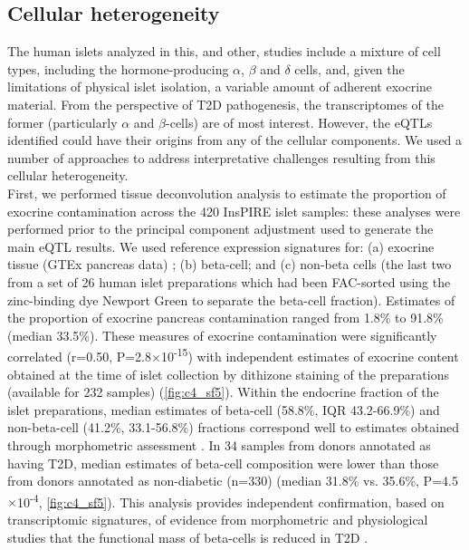 \subsection{Cellular heterogeneity}	 	 	 	
The human islets analyzed in this, and other, studies include a mixture of cell types, including the hormone-producing $\alpha$, $\beta$ and $\delta$ cells, and, given the limitations of physical islet isolation, a variable amount of adherent exocrine material. From the perspective of T2D pathogenesis, the transcriptomes of the former (particularly $\alpha$ and $\beta$-cells) are of most interest. However, the eQTLs identified could have their origins from any of the cellular components. We used a number of approaches to address interpretative challenges resulting from this cellular heterogeneity. \\
    
First, we performed tissue deconvolution analysis to estimate the proportion of exocrine contamination across the 420 InsPIRE islet samples: these analyses were performed prior to the principal component adjustment used to generate the main eQTL results. We used reference expression signatures for: (a) exocrine tissue (GTEx pancreas data) \cite{gtexconsortiumGeneticEffectsGene2017}; (b) beta-cell; and (c) non-beta cells (the last two from a set of 26 human islet preparations which had been FAC-sorted using the zinc-binding dye Newport Green to separate the beta-cell fraction). Estimates of the proportion of exocrine pancreas contamination ranged from 1.8\% to 91.8\% (median 33.5\%). These measures of exocrine contamination were significantly correlated (r=0.50, P=2.8$\times$10\textsuperscript{-15}) with independent estimates of exocrine content obtained at the time of islet collection by dithizone staining of the preparations (available for 232 samples) (\ref{fig:c4_sf5}). Within the endocrine fraction of the islet preparations, median estimates of beta-cell (58.8\%, IQR 43.2-66.9\%) and non-beta-cell (41.2\%, 33.1-56.8\%) fractions correspond well to estimates obtained through morphometric assessment \cite{kimIsletArchitectureComparative2009}. In 34 samples from donors annotated as having T2D, median estimates of beta-cell composition were lower than those from donors annotated as non-diabetic (n=330) (median 31.8\% vs. 35.6\%, P=4.5$\times$10\textsuperscript{-4}, \ref{fig:c4_sf5}). This analysis provides independent confirmation, based on transcriptomic signatures, of evidence from morphometric and physiological studies that the functional mass of beta-cells is reduced in T2D \cite{meierRoleReducedVcell2013, butlerCriticalAnalysisClinical2013}. \\


